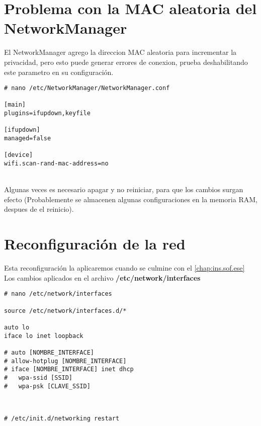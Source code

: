 \section{Problema con la MAC aleatoria del NetworkManager}
El NetworkManager agrego la direccion MAC aleatoria para incrementar la privacidad, pero esto puede generar errores de conexion, prueba deshabilitando este parametro en su configuración.
\begin{verbatim}
# nano /etc/NetworkManager/NetworkManager.conf

[main]
plugins=ifupdown,keyfile

[ifupdown]
managed=false

[device]
wifi.scan-rand-mac-address=no
\end{verbatim}
\\[1em]
Algunas veces es necesario apagar y no reiniciar, para que los cambios surgan efecto (Probablemente se almacenen algunas configuraciones en la memoria RAM, despues de el reinicio).\\

\section{Reconfiguración de la red}
Esta reconfiguración la aplicaremos cuando se culmine con el \autoref{chap:ins.sof.ese}\\
Los cambios aplicados en el archivo \textbf{/etc/network/interfaces}
\begin{verbatim}
# nano /etc/network/interfaces
 
source /etc/network/interfaces.d/*

auto lo
iface lo inet loopback

# auto [NOMBRE_INTERFACE]
# allow-hotplug [NOMBRE_INTERFACE]
# iface [NOMBRE_INTERFACE] inet dhcp
#   wpa-ssid [SSID]
#   wpa-psk [CLAVE_SSID]
\end{verbatim}
\\[1em]

\begin{verbatim}
# /etc/init.d/networking restart
\end{verbatim}
\\[1em]

